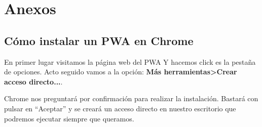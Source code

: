 \chapter{Anexos}\label{anexos}

\section{Cómo instalar un PWA en Chrome}

En primer lugar visitamos la página web del PWA Y hacemos click es la pestaña de opciones. Acto seguido vamos a la opción: \textbf{Más herramientas\textgreater Crear acceso directo...}.


Chrome nos preguntará por confirmación para realizar la instalación. Bastará con pulsar en ``Aceptar'' y se creará un acceso directo en nuestro escritorio que podremos ejecutar siempre que queramos.



